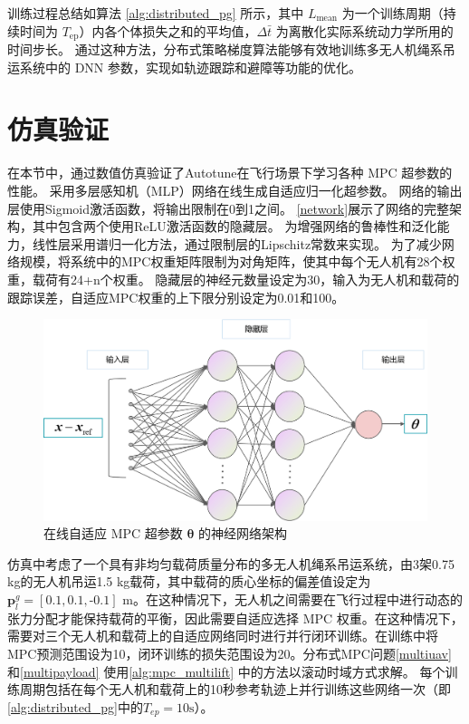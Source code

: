 \documentclass[lang=chs, degree=master, blindreview=true, winfonts=true]{yanputhesis}
\begin{document}
训练过程总结如算法 \ref{alg:distributed_pg} 所示，其中 $L_{\text{mean}}$ 为一个训练周期（持续时间为 $T_{\text{ep}}$）内各个体损失之和的平均值，$\Delta \bar{t}$ 为离散化实际系统动力学所用的时间步长。
通过这种方法，分布式策略梯度算法能够有效地训练多无人机绳系吊运系统中的 DNN 参数，实现如轨迹跟踪和避障等功能的优化。


\section{仿真验证}
在本节中，通过数值仿真验证了Autotune在飞行场景下学习各种 MPC 超参数的性能。 采用多层感知机（MLP）网络在线生成自适应归一化超参数。 网络的输出层使用Sigmoid激活函数，将输出限制在0到1之间。 \autoref{network}展示了网络的完整架构，其中包含两个使用ReLU激活函数的隐藏层。 为增强网络的鲁棒性和泛化能力，线性层采用谱归一化方法，通过限制层的Lipschitz常数来实现。 为了减少网络规模，将系统中的MPC权重矩阵限制为对角矩阵，使其中每个无人机有28个权重，载荷有24+n个权重。 隐藏层的神经元数量设定为30，输入为无人机和载荷的跟踪误差，自适应MPC权重的上下限分别设定为0.01和100。

\begin{figure}[hbt!]
	\centering
	\includegraphics[width=30pc]{picture/kk/图片3.png} 
	\caption{在线自适应 MPC 超参数 $\bm \theta$ 的神经网络架构} 
	\label{network}
\end{figure}
仿真中考虑了一个具有非均匀载荷质量分布的多无人机绳系吊运系统，由3架0.75 kg的无人机吊运1.5 kg载荷，其中载荷的质心坐标的偏差值设定为 $\bm p_{l}^g=[\text{0.1},\text{0.1},\text{-0.1}]$ m。在这种情况下，无人机之间需要在飞行过程中进行动态的张力分配才能保持载荷的平衡，因此需要自适应选择 MPC 权重。在这种情况下，需要对三个无人机和载荷上的自适应网络同时进行并行闭环训练。在训练中将MPC预测范围设为10，闭环训练的损失范围设为20。分布式MPC问题\autoref{multiuav} 和\autoref{multipayload} 使用\autoref{alg:mpc_multilift} 中的方法以滚动时域方式求解。
每个训练周期包括在每个无人机和载荷上的10秒参考轨迹上并行训练这些网络一次（即\autoref{alg:distributed_pg}中的$T_{ep}= \text{10s}$）。
\end{document}
